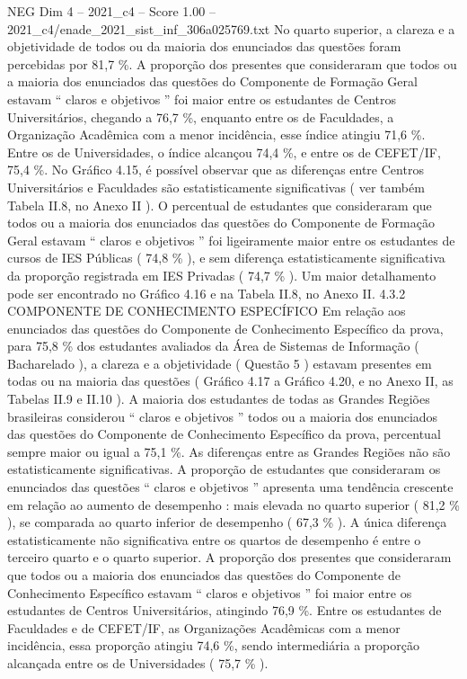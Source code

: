 \begin{textsample}{NEG Dim 4 – 2021\_c4 – Score 1.00 – 2021\_c4/enade\_2021\_sist\_inf\_306a025769.txt}
No quarto superior, a clareza e a objetividade de todos ou da maioria dos enunciados das questões foram percebidas por 81,7 \%.
A proporção dos presentes que consideraram que todos ou a maioria dos enunciados das questões do Componente de Formação Geral estavam “ claros e objetivos ” foi maior entre os estudantes de Centros Universitários, chegando a 76,7 \%, enquanto entre os de Faculdades, a Organização Acadêmica com a menor incidência, esse índice atingiu 71,6 \%.
Entre os de Universidades, o índice alcançou 74,4 \%, e entre os de CEFET/IF, 75,4 \%.
No Gráfico 4.15, é possível observar que as diferenças entre Centros Universitários e Faculdades são estatisticamente significativas ( ver também Tabela II.8, no Anexo II ).
O percentual de estudantes que consideraram que todos ou a maioria dos enunciados das questões do Componente de Formação Geral estavam “ claros e objetivos ” foi ligeiramente maior entre os estudantes de cursos de IES Públicas ( 74,8 \% ), e sem diferença estatisticamente significativa da proporção registrada em IES Privadas ( 74,7 \% ).
Um maior detalhamento pode ser encontrado no Gráfico 4.16 e na Tabela II.8, no Anexo II. 4.3.2 COMPONENTE DE CONHECIMENTO ESPECÍFICO Em relação aos enunciados das questões do Componente de Conhecimento Específico da prova, para 75,8 \% dos estudantes avaliados da Área de Sistemas de Informação ( Bacharelado ), a clareza e a objetividade ( Questão 5 ) estavam presentes em todas ou na maioria das questões ( Gráfico 4.17 a Gráfico 4.20, e no Anexo II, as Tabelas II.9 e II.10 ).
A maioria dos estudantes de todas as Grandes Regiões brasileiras considerou “ claros e objetivos ” todos ou a maioria dos enunciados das questões do Componente de Conhecimento Específico da prova, percentual sempre maior ou igual a 75,1 \%.
As diferenças entre as Grandes Regiões não são estatisticamente significativas.
A proporção de estudantes que consideraram os enunciados das questões “ claros e objetivos ” apresenta uma tendência crescente em relação ao aumento de desempenho : mais elevada no quarto superior ( 81,2 \% ), se comparada ao quarto inferior de desempenho ( 67,3 \% ).
A única diferença estatisticamente não significativa entre os quartos de desempenho é entre o terceiro quarto e o quarto superior.
A proporção dos presentes que consideraram que todos ou a maioria dos enunciados das questões do Componente de Conhecimento Específico estavam “ claros e objetivos ” foi maior entre os estudantes de Centros Universitários, atingindo 76,9 \%.
Entre os estudantes de Faculdades e de CEFET/IF, as Organizações Acadêmicas com a menor incidência, essa proporção atingiu 74,6 \%, sendo intermediária a proporção alcançada entre os de Universidades ( 75,7 \% ).

\end{textsample}
